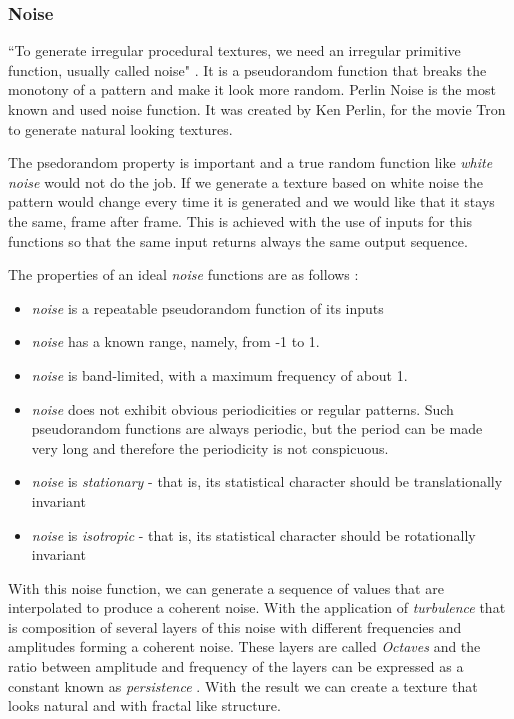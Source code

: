
\subsubsection{Noise} %
\label{ssub:noise}


``To generate irregular procedural textures, we need an irregular primitive function, usually called noise" \cite{Ebert2002}. It is a pseudorandom function that breaks the monotony of a pattern and make it look more random.
Perlin Noise is the most known and used noise function. It was created by Ken Perlin, for the movie Tron to generate natural looking textures.

The psedorandom property is important and a true random function like \emph{white noise} would not do the job. If we generate a texture based on white noise the pattern would change every time it is generated and we would like that it stays the same, frame after frame. This is achieved with the use of inputs for this functions so that the same input returns always the same output sequence. 

The properties of an ideal \emph{noise} functions are as follows \cite{Ebert2002}:
\begin{itemize}
	\item \emph{noise} is a repeatable pseudorandom function of its inputs
	\item \emph{noise} has a known range, namely, from -1 to 1.
	\item \emph{noise} is band-limited, with a maximum frequency of about 1.
	\item \emph{noise} does not exhibit obvious periodicities or regular patterns. Such pseudorandom functions are always periodic, but the period can be made very long and therefore the periodicity is not conspicuous.
	\item \emph{noise} is \emph{stationary} - that is, its statistical character should be translationally invariant
	\item \emph{noise} is \emph{isotropic} - that is, its statistical character should be rotationally invariant
\end{itemize}

With this noise function, we can generate a sequence of values that are interpolated to produce a coherent noise. With the application of \emph{turbulence} that is composition of several layers of this noise with different frequencies and amplitudes forming a coherent noise. These layers are called \emph{Octaves} and the ratio between amplitude and frequency of the layers can be expressed as a constant known as \emph{persistence} \cite{Kelly2008}. With the result we can create a texture that looks natural and with fractal like structure.


